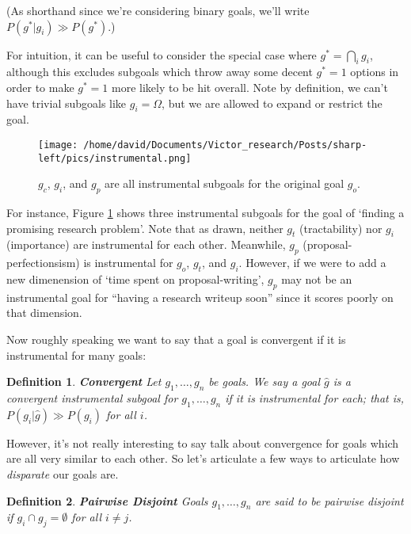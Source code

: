 \documentclass{article}
\newtheorem{definition}{Definition}
\begin{document}
(As shorthand since we're considering binary goals, we'll write $P(g^*|g_i)\gg P(g^*)$.)

For intuition, it can be useful to consider the special case where $g^* = \bigcap_i g_i$, although this excludes subgoals which throw away some decent $g^*=1$ options in order to make $g^*=1$ more likely to be hit overall. Note by definition, we can't have trivial subgoals like $g_i=\Omega$, but we are allowed to expand or restrict the goal. 

\begin{figure}[ht]
    \centering
    \texttt{[image: /home/david/Documents/Victor\_research/Posts/sharp-left/pics/instrumental.png]} 
    \caption{$g_c$, $g_i$, and $g_p$ are all instrumental subgoals for the original goal $g_o$.}
    \label{fig:instrumental} 
\end{figure}

For instance, Figure \ref{fig:instrumental} shows three instrumental subgoals for the goal of `finding a promising research problem'. Note that as drawn, neither $g_t$ (tractability) nor $g_i$ (importance) are instrumental for each other. Meanwhile, $g_p$ (proposal-perfectionsism) is instrumental for $g_o$, $g_t$, and $g_i$. However, if we were to add a new dimenension of `time spent on proposal-writing', $g_p$ may not be an instrumental goal for ``having a research writeup soon'' since it scores poorly on that dimension.

Now roughly speaking we want to say that a goal is convergent if it is instrumental for many goals:


\begin{definition}{\textbf{Convergent}}
    Let $g_1, \dots, g_n$ be goals. We say a goal $\hat{g}$ is a convergent instrumental subgoal for $g_1, \dots, g_n$ if it is instrumental for each; that is, $P(g_i|\hat{g})\gg P(g_i)$ for all $i$.
\end{definition}

However, it's not really interesting to say talk about convergence for goals which are all very similar to each other. So let's articulate a few ways to articulate how \emph{disparate} our goals are.

\begin{definition}{\textbf{Pairwise Disjoint}}
    Goals $g_1, \dots, g_n$ are said to be \emph{pairwise disjoint} if $g_i\cap g_j=\emptyset$ for all $i \neq j$.
\end{definition}
\end{document}
